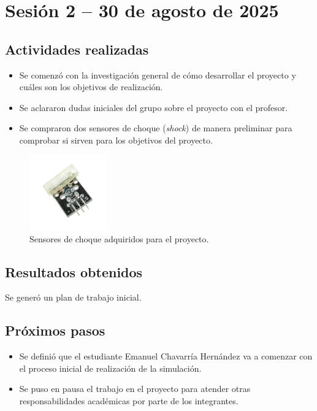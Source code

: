 \documentclass[12pt,letterpaper]{article}
\begin{document}
\newpage

\section{Sesión 2 -- 30 de agosto de 2025}
\subsection*{Actividades realizadas}
\begin{itemize}
    \item Se comenzó con la investigación general de cómo desarrollar el proyecto y cuáles son los objetivos de realización.
    \item Se aclararon dudas iniciales del grupo sobre el proyecto con el profesor.
    \item Se compraron dos sensores de choque (\textit{shock}) de manera preliminar para comprobar si sirven para los objetivos del proyecto.
\end{itemize}

\begin{figure}[H]
    \centering
    \includegraphics[width=0.3\textwidth]{images/sensor.jpg} %
    \caption{Sensores de choque adquiridos para el proyecto.}
    \label{fig:sensores}
\end{figure}

\subsection*{Resultados obtenidos}
Se generó un plan de trabajo inicial.

\subsection*{Próximos pasos}
\begin{itemize}
    \item Se definió que el estudiante Emanuel Chavarría Hernández va a comenzar con el proceso inicial de realización de la simulación.
    \item Se puso en pausa el trabajo en el proyecto para atender otras responsabilidades académicas por parte de los integrantes.
\end{itemize}
\end{document}

